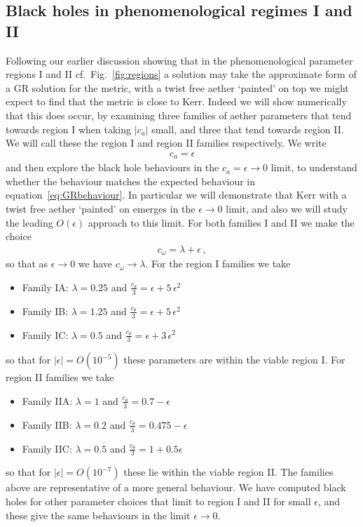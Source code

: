 \documentclass[12pt]{article}
\numberwithin{equation}{section}
\begin{document}
\subsection{Black holes in phenomenological regimes I and II}
\label{sec:phenobh}

Following our earlier discussion showing that in the phenomenological parameter regions I and II  cf.\ Fig.~\ref{fig:regions} a solution may take the approximate form of a GR solution for the metric, with a twist free aether `painted' on top we might expect to find that the metric is close to Kerr.
Indeed we will show numerically that this does occur, by examining three families of aether parameters that tend towards region I when taking $|c_{a}|$ small, and three that tend towards region II. 
We will call these the region I and region II families respectively.
We write
\begin{eqnarray}
c_{a} = \epsilon
\end{eqnarray}
and then explore the black hole behaviours in the $c_a = \epsilon \to 0$ limit, to understand whether the behaviour matches the expected behaviour in equation~\eqref{eq:GRbehaviour}. In particular we will demonstrate that Kerr with a twist free aether `painted' on emerges in the $\epsilon \to 0$ limit, and also we will study the leading $O(\epsilon)$ approach to this limit. 
For both families I and II we make the choice
\begin{eqnarray}
c_\omega = \lambda + \epsilon \, ,
\end{eqnarray}
so that as $\epsilon \to 0$ we have $c_\omega \to \lambda$.
For the region I families we take
\begin{itemize}
    \item Family IA: $\lambda = 0.25$ and $\frac{c_\theta}{3} = \epsilon +5 \, \epsilon^2$
    \item Family IB: $\lambda = 1.25$ and $\frac{c_\theta}{3} = \epsilon +5 \, \epsilon^2$
    \item Family IC: $\lambda = 0.5$ and $\frac{c_\theta}{3} = \epsilon +3 \, \epsilon^2$
\end{itemize}
so that for $| \epsilon | = O(10^{-5})$ these parameters are within the viable region I. For region II families  we take
\begin{itemize}
    \item Family IIA: $\lambda = 1$ and $\frac{c_\theta}{3} = 0.7 - \epsilon$   
    \item Family IIB: $\lambda = 0.2$ and $\frac{c_\theta}{3} = 0.475  - \epsilon$  
    \item Family IIC: $\lambda = 0.5$ and $\frac{c_\theta}{3} = 1 + 0.5\epsilon$  
\end{itemize}
so that for $| \epsilon | = O(10^{-7})$ these lie within the viable region II. The families above are representative of a more general behaviour.
We have computed black holes for other parameter choices that limit to region I and II for small $\epsilon$, and these give the same behaviours in the limit $\epsilon \to 0$.
\end{document}
